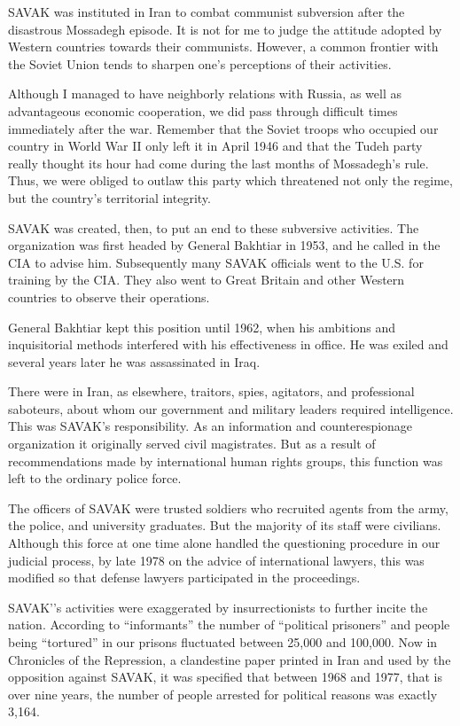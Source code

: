 SAVAK was instituted in Iran to combat communist subversion after the disastrous Mossadegh episode. It is not for me to judge the attitude adopted by Western countries towards their communists. However, a common frontier with the Soviet Union tends to sharpen one’s perceptions of their activities. 

Although I managed to have neighborly relations with Russia, as well as advantageous economic cooperation, we did pass through difficult times immediately after the war. Remember that the Soviet troops who occupied our country in World War II only left it in April 1946 and that the Tudeh party really thought its hour had come during the last months of Mossadegh’s rule. Thus, we were obliged to outlaw this party which threatened not only the regime, but the country’s territorial integrity. 

SAVAK was created, then, to put an end to these subversive activities. The organization was first headed by General Bakhtiar in 1953, and he called in the CIA to advise him. Subsequently many SAVAK officials went to the U.S. for training by the CIA. They also went to Great Britain and other Western countries to observe their operations. 

General Bakhtiar kept this position until 1962, when his ambitions and inquisitorial methods interfered with his effectiveness in office. He was exiled and several years later he was assassinated in Iraq. 


There were in Iran, as elsewhere, traitors, spies, agitators, and professional saboteurs, about whom our government and military leaders required intelligence. This was SAVAK’s responsibility. As an information and counterespionage organization it originally served civil magistrates. But as a result of recommendations made by international human rights groups, this function was left to the ordinary police force. 

The officers of SAVAK were trusted soldiers who recruited agents from the army, the police, and university graduates. But the majority of its staff were civilians. Although this force at one time alone handled the questioning procedure in our judicial process, by late 1978 on the advice of international lawyers, this was modified so that defense lawyers participated in the proceedings. 

SAVAK'’s activities were exaggerated by insurrectionists to further incite the nation. According to “informants” the number of “political prisoners” and people being “tortured” in our prisons fluctuated between 25,000 and 100,000. Now in Chronicles of the Repression, a clandestine paper printed in Iran and used by the opposition against SAVAK, it was specified that between 1968 and 1977, that is over nine years, the number of people arrested for political reasons was exactly 3,164. 

